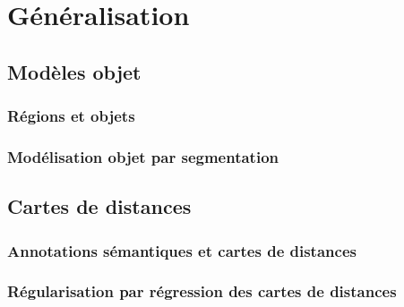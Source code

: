 \chapter{Généralisation}

\section{Modèles objet}

\subsection{Régions et objets}

\subsection{Modélisation objet par segmentation}

\section{Cartes de distances}

\subsection{Annotations sémantiques et cartes de distances}

\subsection{Régularisation par régression des cartes de distances}
